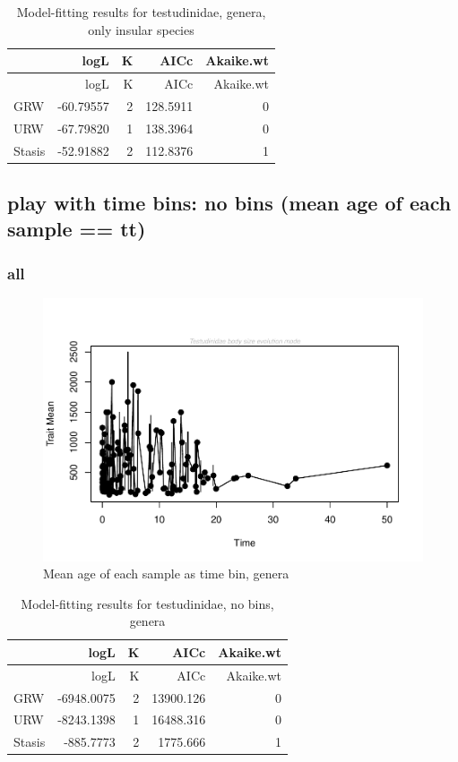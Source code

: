 \documentclass[]{article}
\begin{document}
\begin{longtable}[]{@{}lrrrr@{}}
\caption{Model-fitting results for testudinidae, genera, only insular
species}\tabularnewline
\toprule
& logL & K & AICc & Akaike.wt\tabularnewline
\midrule
\endfirsthead
\toprule
& logL & K & AICc & Akaike.wt\tabularnewline
\midrule
\endhead
GRW & -60.79557 & 2 & 128.5911 & 0\tabularnewline
URW & -67.79820 & 1 & 138.3964 & 0\tabularnewline
Stasis & -52.91882 & 2 & 112.8376 & 1\tabularnewline
\bottomrule
\end{longtable}

\newpage

\subsection{play with time bins: no bins (mean age of each sample ==
tt)}\label{play-with-time-bins-no-bins-mean-age-of-each-sample-tt}

\subsubsection{all}\label{all-1}

\begin{figure}[htbp]
\centering
\includegraphics{MA_JJ_files/figure-latex/paleoTS with different time bins, no bins, genera-1.pdf}
\caption{Mean age of each sample as time bin, genera}
\end{figure}

\begin{longtable}[]{@{}lrrrr@{}}
\caption{Model-fitting results for testudinidae, no bins,
genera}\tabularnewline
\toprule
& logL & K & AICc & Akaike.wt\tabularnewline
\midrule
\endfirsthead
\toprule
& logL & K & AICc & Akaike.wt\tabularnewline
\midrule
\endhead
GRW & -6948.0075 & 2 & 13900.126 & 0\tabularnewline
URW & -8243.1398 & 1 & 16488.316 & 0\tabularnewline
Stasis & -885.7773 & 2 & 1775.666 & 1\tabularnewline
\bottomrule
\end{longtable}
\end{document}
